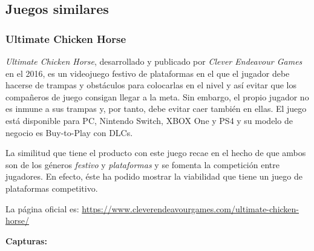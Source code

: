 \subsection{Juegos similares}

\subsubsection{Ultimate Chicken Horse}\label{subsubsec:UCH}

\emph{Ultimate Chicken Horse}, desarrollado y publicado por \emph{Clever
Endeavour Games} en el 2016, es un videojuego festivo de plataformas en el que
el jugador debe hacerse de trampas y obstáculos para colocarlas en el nivel y
así evitar que los compañeros de juego consigan llegar a la meta. Sin embargo,
el propio jugador no es inmune a sus trampas y, por tanto, debe evitar caer
también en ellas. El juego está disponible para PC, Nintendo Switch, XBOX One y
PS4 y su modelo de negocio es Buy-to-Play con DLCs.

La similitud que tiene el producto con este juego recae en el hecho de que ambos
son de los géneros \emph{festivo} y \emph{plataformas} y se fomenta la
competición entre jugadores. En efecto, éste ha podido mostrar la viabilidad que
tiene un juego de plataformas competitivo.

La página oficial es:
\url{https://www.cleverendeavourgames.com/ultimate-chicken-horse/}

\textbf{Capturas:}

